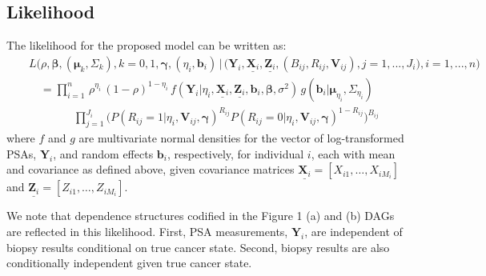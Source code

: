 \documentclass[12pt, letterpaper]{article}
\newcommand{\bmbeta}{\boldsymbol{\beta}}
\newcommand{\bmmu}{\boldsymbol{\mu}}
\newcommand{\bmgamma}{\boldsymbol{\gamma}}
\newcommand{\bmY}{\mathbf{Y}}
\newcommand{\bmZ}{\mathbf{Z}}
\newcommand{\bmX}{\mathbf{X}}
\newcommand{\bmV}{\mathbf{V}}
\newcommand{\bmb}{\mathbf{b}}
\newcommand{\bea}{\begin{eqnarray}}
\newcommand{\eea}{\end{eqnarray}}
\newcommand{\mydots}{...}
\begin{document}




%

\subsection{Likelihood}

The likelihood for the proposed model can be written as:
\bea
&&L\Big(\rho, \bmbeta, (\bmmu_k, \Sigma_k), k=0,1, \bmgamma, (\eta_i, \bmb_i)  \, | \,\big( \bmY_i, \underline{\bmX_i}, \underline{\bmZ_i}, (B_{ij}, R_{ij}, \bmV_{ij}), j=1,\mydots,J_i \big), i=1,\mydots,n \Big) \nonumber \\
&& \quad =  \prod_{i=1}^{n}  \,  \rho^{\eta_i}\,(1-\rho)^{1-\eta_i}\, f(\bmY_i | \eta_i, \underline{\bmX_i}, \underline{\bmZ_i}, \bmb_i, \bmbeta, \sigma^2) \, g(\bmb_i |  \bmmu_{\eta_i}, \Sigma_{\eta_i})  \nonumber \\
\label{eq:lik-unadj}
&& \qquad \qquad \prod_{j=1}^{J_i}  \big(P(R_{ij}=1 | \eta_i, \bmV_{ij}, \bmgamma) ^{R_{ij}} P(R_{ij}=0 | \eta_i, \bmV_{ij}, \bmgamma)^{1-R_{ij}} \big)^{B_{ij}}
\eea
where $f$ and $g$ are multivariate normal densities for the vector of log-transformed PSAs, $\bmY_i$, and random effects $\bmb_i$, respectively, for individual $i$, each with mean and covariance as defined above, given covariance matrices $\underline{\bmX_i} = [X_{i1},\dots, X_{iM_i}]$ and $\underline{\bmZ_i} = [Z_{i1},\dots,Z_{iM_i}]$. 

We note that dependence structures codified in the Figure 1 (a) and (b) DAGs are reflected in this likelihood. First, PSA measurements, $\bmY_i$, are independent of biopsy results conditional on true cancer state. Second, biopsy results are also conditionally independent given true cancer state. 
\end{document}
